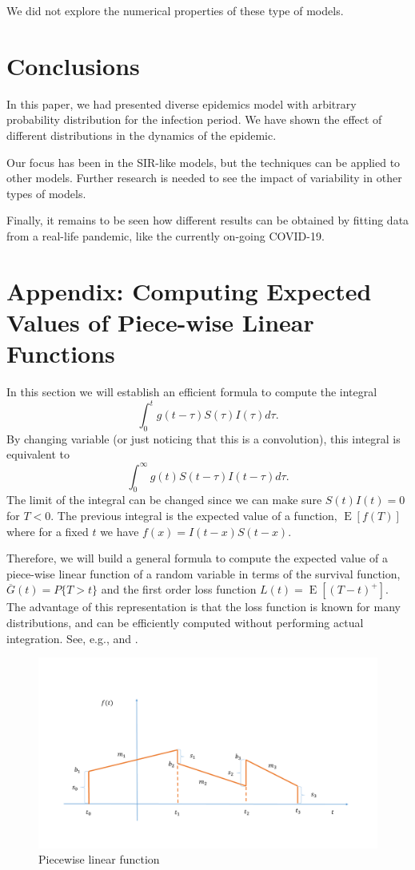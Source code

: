 \documentclass[USenglish,10pt]{article}
\newcommand{\eg}{e.g.\xspace}
\newcommand{\Gb}{\overline{G}\xspace}
\DeclareMathOperator{\Exp}{E}       %
\newcommand{\E}[1]{\Exp\left[{#1}\right]}       %
\begin{document}
We did not explore the numerical properties of these type of models.

\section{Conclusions}\label{sc:concl}

In this paper, we had presented diverse epidemics model with arbitrary probability distribution for the infection period. We have shown the effect of different distributions in the dynamics of the epidemic.

Our focus has been in the SIR-like models, but the techniques can be applied to other models. Further research is needed to see the impact of variability in other types of models.

Finally, it remains to be seen how different results can be obtained by fitting data from a real-life pandemic, like the currently on-going COVID-19.

\appendix

\section{Appendix: Computing Expected Values of Piece-wise Linear Functions} \label{app:piecewise}

In this section we will establish an efficient formula to compute the integral
\[ \int_0^{t} g(t-\tau) S(\tau)I(\tau)d\tau.  \]
By changing variable (or just noticing that this is a convolution), this integral is equivalent to
\[  \int_0^{\infty} g(t) S(t-\tau)I(t-\tau)d\tau.  \]
The limit of the integral can be changed since we can make sure $S(t)I(t)=0$ for $T<0$. The previous integral is the expected value of a function, $\E{f(T)}$ where for a fixed $t$ we have $f(x)=I(t-x)S(t-x)$.

Therefore, we will build a general formula to compute the expected value of a piece-wise linear function of a random variable in terms  of the survival function, $\Gb(t) = P\{T >t\}$ and the first order loss function $L(t)=\E{(T-t)^+}$.
The advantage of this representation is that the loss function is known for many distributions, and can be efficiently computed without performing actual integration. See, \eg, \cite[Page 14]{burn.ea.10} and \cite[Appendix C]{zipk00}.

\begin{figure}[ht]
    \centering
    \includegraphics[width=.6\textwidth]{figures/piecewise}
    \caption{Piecewise linear function}
    \label{fg:piecewise}
\end{figure}
\end{document}
